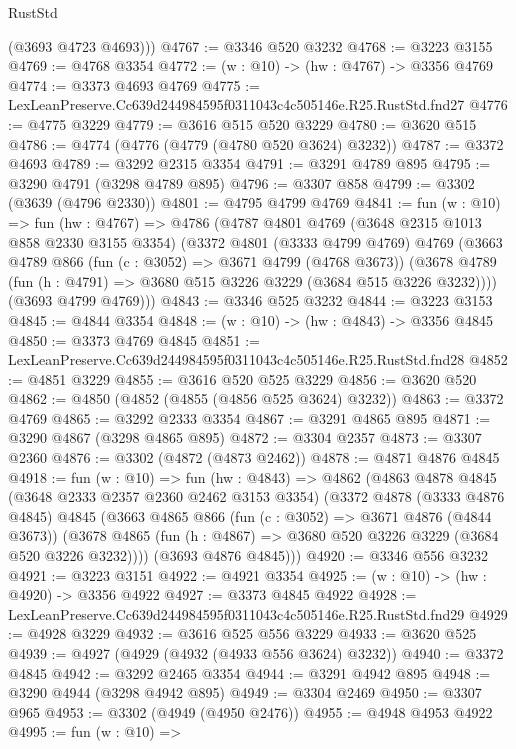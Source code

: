 \begin{lexlean}{RustStd}
\begin{coremodule}
        (@3693 @4723 @4693)))
@4767 := @3346 @520 @3232
@4768 := @3223 @3155
@4769 := @4768 @3354
@4772 := (w : @10) -> (hw : @4767) -> @3356 @4769
@4774 := @3373 @4693 @4769
@4775 := LexLeanPreserve.Cc639d244984595f0311043c4c505146e.R25.RustStd.fnd27
@4776 := @4775 @3229
@4779 := @3616 @515 @520 @3229
@4780 := @3620 @515
@4786 := @4774 (@4776 (@4779 (@4780 @520 @3624) @3232))
@4787 := @3372 @4693
@4789 := @3292 @2315 @3354
@4791 := @3291 @4789 @895
@4795 := @3290 @4791 (@3298 @4789 @895)
@4796 := @3307 @858
@4799 := @3302 (@3639 (@4796 @2330))
@4801 := @4795 @4799 @4769
@4841 := fun (w : @10) =>
  fun (hw : @4767) =>
  @4786
    (@4787
      @4801
      @4769
      (@3648 @2315 @1013 @858 @2330 @3155 @3354)
      (@3372
        @4801
        (@3333 @4799 @4769)
        @4769
        (@3663
          @4789
          @866
          (fun (c : @3052) => @3671 @4799 (@4768 @3673))
          (@3678 @4789 (fun (h : @4791) => @3680 @515 @3226 @3229 (@3684 @515 @3226 @3232))))
        (@3693 @4799 @4769)))
@4843 := @3346 @525 @3232
@4844 := @3223 @3153
@4845 := @4844 @3354
@4848 := (w : @10) -> (hw : @4843) -> @3356 @4845
@4850 := @3373 @4769 @4845
@4851 := LexLeanPreserve.Cc639d244984595f0311043c4c505146e.R25.RustStd.fnd28
@4852 := @4851 @3229
@4855 := @3616 @520 @525 @3229
@4856 := @3620 @520
@4862 := @4850 (@4852 (@4855 (@4856 @525 @3624) @3232))
@4863 := @3372 @4769
@4865 := @3292 @2333 @3354
@4867 := @3291 @4865 @895
@4871 := @3290 @4867 (@3298 @4865 @895)
@4872 := @3304 @2357
@4873 := @3307 @2360
@4876 := @3302 (@4872 (@4873 @2462))
@4878 := @4871 @4876 @4845
@4918 := fun (w : @10) =>
  fun (hw : @4843) =>
  @4862
    (@4863
      @4878
      @4845
      (@3648 @2333 @2357 @2360 @2462 @3153 @3354)
      (@3372
        @4878
        (@3333 @4876 @4845)
        @4845
        (@3663
          @4865
          @866
          (fun (c : @3052) => @3671 @4876 (@4844 @3673))
          (@3678 @4865 (fun (h : @4867) => @3680 @520 @3226 @3229 (@3684 @520 @3226 @3232))))
        (@3693 @4876 @4845)))
@4920 := @3346 @556 @3232
@4921 := @3223 @3151
@4922 := @4921 @3354
@4925 := (w : @10) -> (hw : @4920) -> @3356 @4922
@4927 := @3373 @4845 @4922
@4928 := LexLeanPreserve.Cc639d244984595f0311043c4c505146e.R25.RustStd.fnd29
@4929 := @4928 @3229
@4932 := @3616 @525 @556 @3229
@4933 := @3620 @525
@4939 := @4927 (@4929 (@4932 (@4933 @556 @3624) @3232))
@4940 := @3372 @4845
@4942 := @3292 @2465 @3354
@4944 := @3291 @4942 @895
@4948 := @3290 @4944 (@3298 @4942 @895)
@4949 := @3304 @2469
@4950 := @3307 @965
@4953 := @3302 (@4949 (@4950 @2476))
@4955 := @4948 @4953 @4922
@4995 := fun (w : @10) =>

\end{coremodule}
\end{lexlean}
